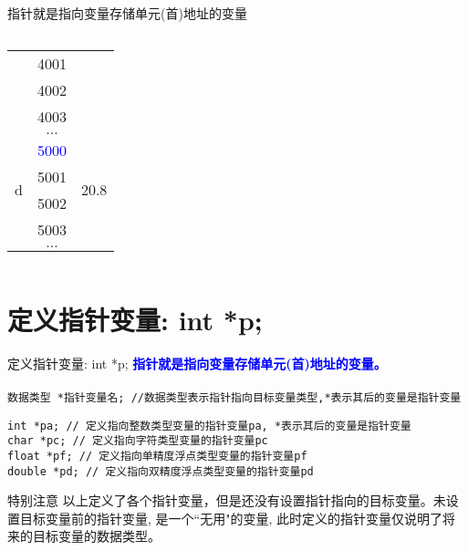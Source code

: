 \begin{frame}{指针就是指向变量存储单元(首)地址的变量}
\begin{columns}[T]
\begin{tabular}{|c|c|c|}
	& 4001 &  \\ \cline{2-2}
	& 4002 &  \\ \cline{2-2}
	& 4003 &  \\ 
	\hline 
	& $\dots$ &  \\ 
	\hline 
	\multirow{4}{*}{d} & \textcolor{blue}{5000} & \multirow{4}{*}{20.8} \\ \cline{2-2}
	& 5001 &  \\ \cline{2-2}
	& 5002 &  \\ \cline{2-2}
	& 5003 &  \\ \cline{2-2}
	& $\dots$ &  \\ 
	\hline 
\end{tabular} 
\end{columns}
\medskip
\end{frame}

\section{定义指针变量: int *p;}

\begin{frame}{定义指针变量: int *p;}
\textbf{\textcolor{blue}{指针就是指向变量存储单元(首)地址的变量。}}\\
~\\
\lstinline|数据类型 *指针变量名; //数据类型表示指针指向目标变量类型,*表示其后的变量是指针变量|
\begin{lstlisting}
int *pa; // 定义指向整数类型变量的指针变量pa, *表示其后的变量是指针变量
char *pc; // 定义指向字符类型变量的指针变量pc
float *pf; // 定义指向单精度浮点类型变量的指针变量pf
double *pd; // 定义指向双精度浮点类型变量的指针变量pd
\end{lstlisting}
\begin{block}{特别注意}
	以上定义了各个指针变量，但是还没有设置指针指向的目标变量。未设置目标变量前的指针变量, 是一个``无用"的变量, 此时定义的指针变量仅说明了将来的目标变量的数据类型。
\end{block}
\end{frame}

